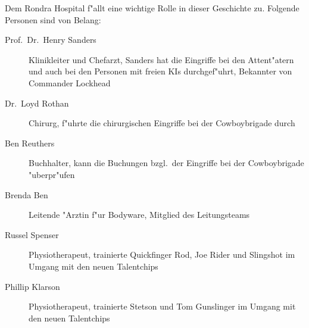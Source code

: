 
Dem Rondra Hospital f"allt eine wichtige Rolle in dieser Geschichte zu. Folgende Personen sind von Belang:

\begin{description}
    \item[Prof.~Dr.~Henry Sanders] Klinikleiter und Chefarzt, Sanders hat die Eingriffe bei den Attent"atern und auch 
        bei den Personen mit freien KIs durchgef"uhrt, Bekannter von Commander Lockhead
    \item[Dr.~Loyd Rothan] Chirurg, f"uhrte die chirurgischen Eingriffe bei der Cowboybrigade durch
    \item[Ben Reuthers] Buchhalter, kann die Buchungen bzgl.~der Eingriffe bei der Cowboybrigade "uberpr"ufen
    \item[Brenda Ben] Leitende "Arztin f"ur Bodyware, Mitglied des Leitungsteams
    \item[Russel Spenser] Physiotherapeut, trainierte Quickfinger Rod, Joe Rider und Slingshot im Umgang mit den neuen 
        Talentchips
    \item[Phillip Klarson] Physiotherapeut, trainierte Stetson und Tom Gunslinger im Umgang mit den neuen Talentchips
\end{description}
